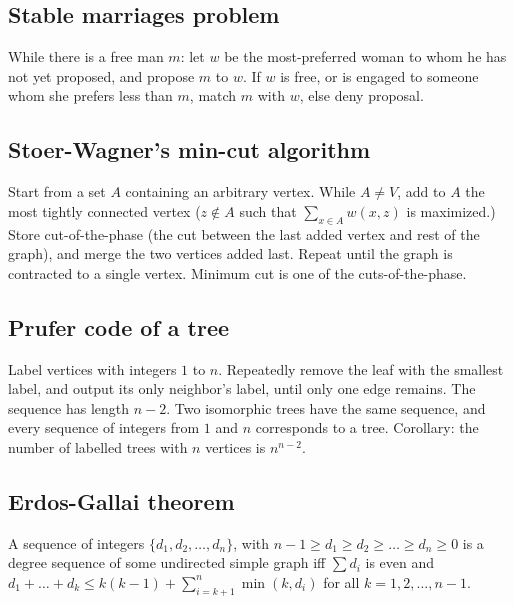 \documentclass[12pt]{extarticle}
\begin{document}
\begin{multicols*}{2}
\subsection{Stable marriages problem}
While there is a free man $m$: let $w$ be the most-preferred woman to whom he
has not yet proposed, and propose $m$ to $w$. If $w$ is free, or is engaged to someone whom
she prefers less than $m$, match $m$ with $w$, else deny proposal.



\subsection{Stoer-Wagner's min-cut algorithm}
Start from a set $A$ containing an arbitrary vertex.
While $A \ne V$, add to $A$ the most tightly connected vertex
($z \notin A$ such that $\sum_{x \in A} w(x, z)$ is maximized.)
Store cut-of-the-phase (the cut between the last added vertex and rest of
the graph), and merge the two vertices added last.  Repeat until the graph
is contracted to a single vertex.  Minimum cut is one of the cuts-of-the-phase.




\subsection{Prufer code of a tree}
Label vertices with integers $1$ to $n$.
Repeatedly remove the leaf with the smallest label, and output its only
neighbor's label, until only one edge remains. The sequence has
length $n-2$.  Two isomorphic trees have the same sequence, and every sequence
of integers from $1$ and $n$ corresponds to a tree.
Corollary: the number of labelled trees with $n$ vertices is $n^{n-2}$.  %

\subsection{Erdos-Gallai theorem}
A sequence of integers $\{ d_1, d_2, \dots, d_n \}$,
with $n-1 \ge d_1 \ge d_2 \ge \dots \ge d_n \ge 0$ is a degree sequence
of some undirected simple graph iff $\sum d_i$ is even and
$d_1 + \dots + d_k \le k(k-1) + \sum_{i=k+1}^n \min(k, d_{i})$
for all $k=1,2,\dots,n-1$.


\end{multicols*}
\end{document}
